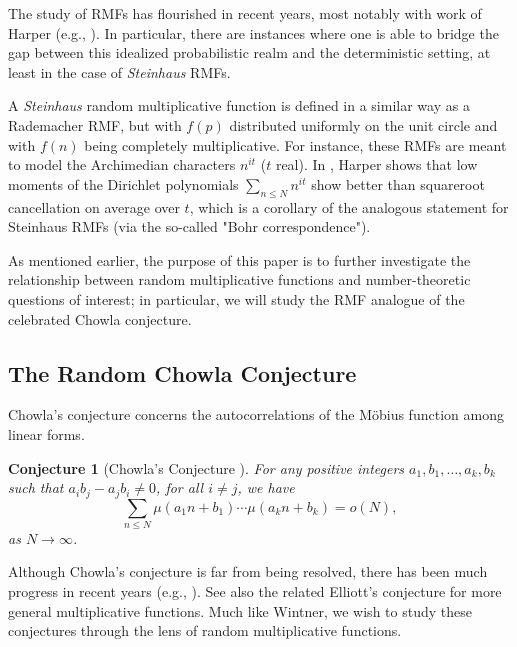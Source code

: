 \documentclass[11pts]{amsart}
\numberwithin{equation}{section}
\newtheorem{conj}{Conjecture}[section]
\begin{document}
The study of RMFs has flourished in recent years, most notably with work of Harper (e.g., \cite{Harper_RMF_1,Harper_RMF_2,Harper_Fluctuations, Harper_Dirichlet_SRC,Harper-Maks_Helson}). In particular, there are instances where one is able to bridge the gap between this idealized probabilistic realm and the deterministic setting, at least in the case of \textit{Steinhaus} RMFs. 

A \emph{Steinhaus} random multiplicative function is defined in a similar way as a Rademacher RMF, but with $f(p)$ distributed uniformly on the unit circle and with $f(n)$ being completely multiplicative. For instance, these RMFs are meant to model the Archimedian characters $n^{it}$ ($t$ real). In \cite[Theorem 2]{Harper_Dirichlet_SRC}, Harper shows that low moments of the Dirichlet polynomials $\sum_{n\leq N} n^{it}$ show better than squareroot cancellation on average over $t$, which is a corollary of the analogous statement for Steinhaus RMFs (via the so-called "Bohr correspondence").

As mentioned earlier, the purpose of this paper is to further investigate the relationship between random multiplicative functions and number-theoretic questions of interest; in particular, we will study the RMF analogue of the celebrated Chowla conjecture.

\subsection{The Random Chowla Conjecture}

Chowla's conjecture concerns the autocorrelations of the M\"obius function among linear forms.

\begin{conj}[Chowla's Conjecture \cite{ChowlaConj}]
    For any positive integers $a_1, b_1, \ldots, a_k, b_k$ such that $a_ib_j - a_jb_i\neq 0$, for all $i\neq j$, we have
    \[
    \sum_{n\leq N}\mu(a_1n + b_1)\cdots\mu(a_kn+b_k)=o(N),
    \]
    as $N\rightarrow\infty$.
\end{conj}

Although Chowla's conjecture is far from being resolved, there has been much progress in recent years (e.g., \cite{Log_Chowla_1,Log_Chowla_3,Log_Chowla_2,MatRadTao_AvgChowla,Helfgott-Maks_LogChowla,Cedric_TwoPoint}). See also the related Elliott's conjecture \cite{MatRadTao_AvgChowla, klurman2023elliottsconjectureapplications} for more general multiplicative functions. Much like Wintner, we wish to study these conjectures through the lens of random multiplicative functions.
\end{document}
